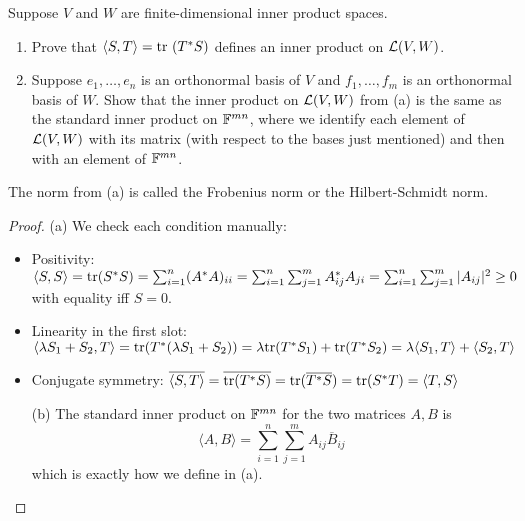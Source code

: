 \documentclass{extarticle}
\begin{document}
\begin{problem}{12}
    Suppose \(V\) and \(W\) are finite-dimensional inner product spaces. 
    \begin{enumerate}[label=(\alph*)]
        \item Prove that \(\langle S,T \rangle = \tr \ (T^* S)\) defines an inner product on \(\mathcal{L}(V, W)\). 
        \item Suppose \(e_1, \ldots, e_n\) is an orthonormal basis of \(V\) and \(f_1, \ldots, f_m\) 
        is an orthonormal basis of \(W\). Show that the inner product on \(\mathcal{L}(V, W)\) from (a) is the same 
        as the standard inner product on \(\mathbb{F}^{mn}\), where we identify each element of \(\mathcal{L}(V, W)\) with 
        its matrix (with respect to the bases just mentioned) and then with an element of \(\mathbb{F}^{mn}\). 
    \end{enumerate}
\end{problem}

\begin{remark}
    The norm from (a) is called the Frobenius norm or the Hilbert-Schmidt norm.
\end{remark}

\begin{proof}
(a) We check each condition manually:
\begin{itemize}
    \item Positivity: \(\langle S,S \rangle = \text{tr} (S^*S) = \sum_{i=1}^{n} (A^*A)_{ii} 
    = \sum_{i=1}^{n} \sum_{j=1}^{m} A^*_{ij} A_{ji} 
    = \sum_{i=1}^{n} \sum_{j=1}^{m} |A_{ij}|^2 \geq 0\) with equality 
    iff \(S = 0\). 
    \item Linearity in the first slot: \(\langle \lambda S_1 + S_2, T \rangle 
    = \text{tr} (T^* (\lambda S_1 + S_2)) 
    = \lambda\text{tr} (T^* S_1) + \text{tr} (T^* S_2) =\lambda \langle S_1,T \rangle + \langle S_2,T \rangle\)
    \item Conjugate symmetry: \( \overline{ \langle S,T \rangle } =\overline{\text{tr} (T^* S)}  
    = \text{tr} (\overline{T^* S}) = \text{tr} (S^* T) = \langle T,S \rangle\) 


    (b) The standard inner product on \(\mathbb{F}^{mn}\) for the two matrices \(A, B\) is 
    \[\langle A,B \rangle = \sum_{i=1}^{n} \sum_{j=1}^{m} A_{ij} \overline{B}_{ij}\] 
    which is exactly how we define in (a).
\end{itemize}
\end{proof}
\end{document}
